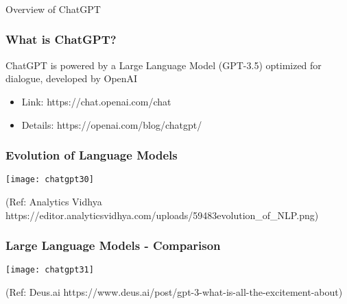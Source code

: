 \begin{frame}[fragile]\frametitle{}
\begin{center}
{\Large Overview of ChatGPT}
\end{center}
\end{frame}

\begin{frame}[fragile]\frametitle{What is ChatGPT?}

ChatGPT is powered by a Large Language Model (GPT-3.5) optimized for 
dialogue, developed by OpenAI

\begin{itemize}
\item Link: https://chat.openai.com/chat
\item Details: https://openai.com/blog/chatgpt/
\end{itemize}	 


\end{frame}


\begin{frame}[fragile]\frametitle{Evolution of Language Models}

\begin{center}
\texttt{[image: chatgpt30]}
\end{center}				
{\tiny (Ref: Analytics Vidhya https://editor.analyticsvidhya.com/uploads/59483evolution\_of\_NLP.png)}

\end{frame}

\begin{frame}[fragile]\frametitle{Large Language Models - Comparison}

\begin{center}
\texttt{[image: chatgpt31]}
\end{center}				
{\tiny (Ref: Deus.ai https://www.deus.ai/post/gpt-3-what-is-all-the-excitement-about)}

\end{frame}



